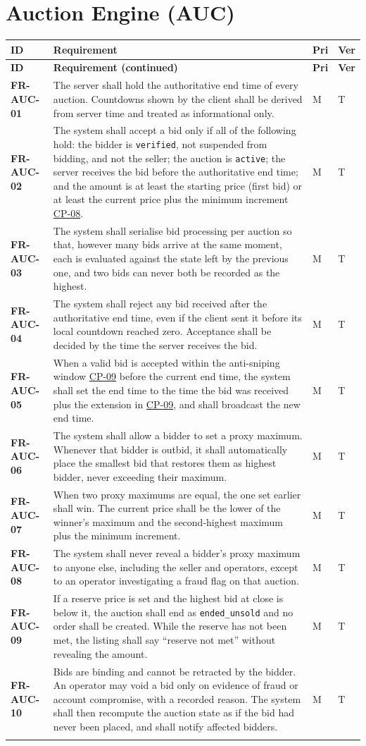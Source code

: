 \documentclass[11pt,a4paper]{report}
\makeatletter
\newenvironment{reqs}{%
  \small
  \begin{longtable}{@{}>{\raggedright\arraybackslash}p{2.35cm}
                       >{\raggedright\arraybackslash}p{10.3cm}
                       >{\centering\arraybackslash}p{0.7cm}
                       >{\centering\arraybackslash}p{0.7cm}@{}}
  \toprule
  \textbf{ID} & \textbf{Requirement} & \textbf{Pri} & \textbf{Ver} \\
  \midrule
  \endfirsthead
  \toprule
  \textbf{ID} & \textbf{Requirement (continued)} & \textbf{Pri} & \textbf{Ver} \\
  \midrule
  \endhead
  \bottomrule
  \endfoot
}{\end{longtable}}
\newcommand{\req}[5]{\leavevmode\textbf{#1}\hypertarget{#1}{} & #5 & #2 & #3 \\ \addlinespace[2pt]}
\newcommand{\cp}[1]{\hyperlink{#1}{#1}}
\makeatother
\begin{document}
\section{Auction Engine (AUC)}
\begin{reqs}
\req{FR-AUC-01}{M}{T}{FR-23}{The server shall hold the authoritative end time of every auction. Countdowns shown by the client shall be derived from server time and treated as informational only.}
\req{FR-AUC-02}{M}{T}{FR-24, new}{The system shall accept a bid only if all of the following hold: the bidder is \texttt{verified}, not suspended from bidding, and not the seller; the auction is \texttt{active}; the server receives the bid before the authoritative end time; and the amount is at least the starting price (first bid) or at least the current price plus the minimum increment \cp{CP-08}.}
\req{FR-AUC-03}{M}{T}{FR-25}{The system shall serialise bid processing per auction so that, however many bids arrive at the same moment, each is evaluated against the state left by the previous one, and two bids can never both be recorded as the highest.}
\req{FR-AUC-04}{M}{T}{FR-26}{The system shall reject any bid received after the authoritative end time, even if the client sent it before its local countdown reached zero. Acceptance shall be decided by the time the server receives the bid.}
\req{FR-AUC-05}{M}{T}{FR-27}{When a valid bid is accepted within the anti-sniping window \cp{CP-09} before the current end time, the system shall set the end time to the time the bid was received plus the extension in \cp{CP-09}, and shall broadcast the new end time.}
\req{FR-AUC-06}{M}{T}{FR-28}{The system shall allow a bidder to set a proxy maximum. Whenever that bidder is outbid, it shall automatically place the smallest bid that restores them as highest bidder, never exceeding their maximum.}
\req{FR-AUC-07}{M}{T}{new}{When two proxy maximums are equal, the one set earlier shall win. The current price shall be the lower of the winner's maximum and the second-highest maximum plus the minimum increment.}
\req{FR-AUC-08}{M}{T}{FR-29}{The system shall never reveal a bidder's proxy maximum to anyone else, including the seller and operators, except to an operator investigating a fraud flag on that auction.}
\req{FR-AUC-09}{M}{T}{FR-30}{If a reserve price is set and the highest bid at close is below it, the auction shall end as \texttt{ended\_unsold} and no order shall be created. While the reserve has not been met, the listing shall say ``reserve not met'' without revealing the amount.}
\req{FR-AUC-10}{M}{T}{new}{Bids are binding and cannot be retracted by the bidder. An operator may void a bid only on evidence of fraud or account compromise, with a recorded reason. The system shall then recompute the auction state as if the bid had never been placed, and shall notify affected bidders.}

\end{reqs}
\end{document}
